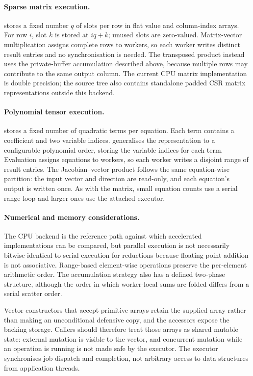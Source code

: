 \documentclass[main.tex]{subfiles}
\begin{document}
    \paragraph{Sparse matrix execution.}
     stores a fixed number $q$ of slots per row in flat value and column-index arrays. For row $i$, slot $k$ is stored at $iq+k$; unused slots are zero-valued. Matrix-vector multiplication assigns complete rows to workers, so each worker writes distinct result entries and no synchronisation is needed. The transposed product instead uses the private-buffer accumulation described above, because multiple rows may contribute to the same output column. The current CPU matrix implementation is double precision; the source tree also contains standalone padded CSR matrix representations outside this backend.

    \paragraph{Polynomial tensor execution.}
     stores a fixed number of quadratic terms per equation. Each term contains a coefficient and two variable indices.  generalises the representation to a configurable polynomial order, storing the variable indices for each term. Evaluation assigns equations to workers, so each worker writes a disjoint range of result entries. The Jacobian--vector product follows the same equation-wise partition: the input vector and direction are read-only, and each equation's output is written once. As with the matrix, small equation counts use a serial range loop and larger ones use the attached executor.

    \paragraph{Numerical and memory considerations.}
    The CPU backend is the reference path against which accelerated implementations can be compared, but parallel execution is not necessarily bitwise identical to serial execution for reductions because floating-point addition is not associative. Range-based element-wise operations preserve the per-element arithmetic order. The accumulation strategy also has a defined two-phase structure, although the order in which worker-local sums are folded differs from a serial scatter order.

    Vector constructors that accept primitive arrays retain the supplied array rather than making an unconditional defensive copy, and the  accessors expose the backing storage. Callers should therefore treat those arrays as shared mutable state: external mutation is visible to the vector, and concurrent mutation while an operation is running is not made safe by the executor. The executor synchronises job dispatch and completion, not arbitrary access to data structures from application threads.
\end{document}
